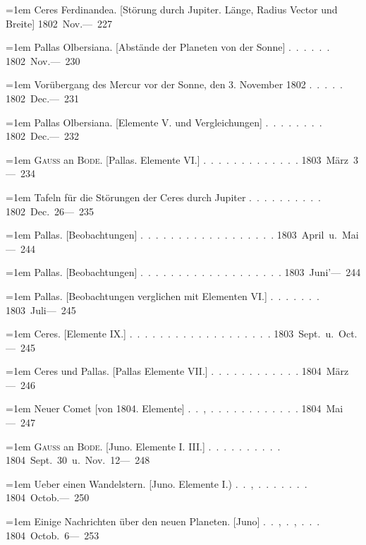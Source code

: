 \noindent\hangindent=1em Ceres Ferdinandea. [Störung durch Jupiter. Länge, Radius Vector und Breite] \hfill\mbox{1802 Nov.}\quad\mbox{--- 227}\par\smallskip
\noindent\hangindent=1em Pallas Olbersiana. [Abstände der Planeten von der Sonne] \mbox{.\ .\ .\ .\ .\ .} \hfill\mbox{1802 Nov.}\quad\mbox{--- 230}\par\smallskip
\noindent\hangindent=1em Vorübergang des Mercur vor der Sonne, den 3. November 1802 \mbox{.\ .\ .\ .\ .} \hfill\mbox{1802 Dec.}\quad\mbox{--- 231}\par\smallskip
\noindent\hangindent=1em Pallas Olbersiana. [Elemente V. und Vergleichungen] \mbox{.\ .\ .\ .\ .\ .\ .\ .} \hfill\mbox{1802 Dec.}\quad\mbox{--- 232}\par\smallskip
\noindent\hangindent=1em \textsc{Gauss} an \textsc{Bode}. [Pallas. Elemente VI.] \mbox{.\ .\ .\ .\ .\ .\ .\ .\ .\ .\ .\ .\ .} \hfill\mbox{1803 März 3}\quad\mbox{--- 234}\par\smallskip
\noindent\hangindent=1em Tafeln für die Störungen der Ceres durch Jupiter \mbox{.\ .\ .\ .\ .\ .\ .\ .\ .\ .} \hfill\mbox{1802 Dec. 26}\quad\mbox{--- 235}\par\smallskip
\noindent\hangindent=1em Pallas. [Beobachtungen] \mbox{.\ .\ .\ .\ .\ .\ .\ .\ .\ .\ .\ .\ .\ .\ .\ .\ .\ .} \hfill\mbox{1803 April u. Mai}\quad\mbox{--- 244}\par\smallskip
\noindent\hangindent=1em Pallas. [Beobachtungen] \mbox{.\ .\ .\ .\ .\ .\ .\ .\ .\ .\ .\ .\ .\ .\ .\ .\ .\ .\ .} \hfill\mbox{1803 Juni}\quad\mbox{'--- 244}\par\smallskip
\noindent\hangindent=1em Pallas. [Beobachtungen verglichen mit Elementen VI.] \mbox{.\ .\ .\ .\ .\ .\ .} \hfill\mbox{1803 Juli}\quad\mbox{--- 245}\par\smallskip
\noindent\hangindent=1em Ceres. [Elemente IX.] \mbox{.\ .\ .\ .\ .\ .\ .\ .\ .\ .\ .\ .\ .\ .\ .\ .\ .\ .\ .} \hfill\mbox{1803 Sept. u. Oct.}\quad\mbox{--- 245}\par\smallskip
\noindent\hangindent=1em Ceres und Pallas. [Pallas Elemente VII.] \mbox{.\ .\ .\ .\ .\ .\ .\ .\ .\ .\ .\ .} \hfill\mbox{1804 März}\quad\mbox{--- 246}\par\smallskip
\noindent\hangindent=1em Neuer Comet [von 1804. Elemente] \mbox{.\ .\ ,\ .\ .\ .\ .\ .\ .\ .\ .\ .\ .\ .\ .} \hfill\mbox{1804 Mai}\quad\mbox{--- 247}\par\smallskip
\noindent\hangindent=1em \textsc{Gauss} an \textsc{Bode}. [Juno. Elemente I. III.] \mbox{.\ .\ .\ .\ .\ .\ .\ .\ .\ .} \hfill\mbox{1804 Sept. 30 u. Nov. 12}\quad\mbox{--- 248}\par\smallskip
\noindent\hangindent=1em Ueber einen Wandelstern. [Juno. Elemente I.) \mbox{.\ .\ ,\ .\ .\ .\ .\ .\ .\ .} \hfill\mbox{1804 Octob.}\quad\mbox{--- 250}\par\smallskip
\noindent\hangindent=1em Einige Nachrichten über den neuen Planeten. [Juno] \mbox{.\ .\ ,\ .\ ,\ .\ .\ .} \hfill\mbox{1804 Octob. 6}\quad\mbox{--- 253}\par\smallskip
\endgroup
